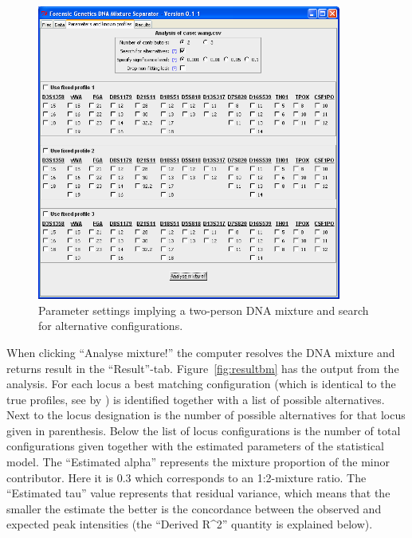 \documentclass[a4paper,11pt]{article}
\begin{document}
\begin{figure}[!h]
  \centering
  \includegraphics[width=10cm]{param_nofixed}
  \caption{\label{fig:nofixed}Parameter settings implying a two-person
    DNA mixture and search for alternative configurations.}
\end{figure}

When clicking ``Analyse mixture!'' the computer resolves the DNA
mixture and returns result in the
``Result''-tab. Figure~\ref{fig:resultbm} has the output from the
analysis. For each locus a best matching configuration (which is
identical to the true profiles, see by \citet{wang2006}) is identified
together with a list of possible alternatives. Next to the locus
designation is the number of possible alternatives for that locus
given in parenthesis. Below the list of locus configurations is the
number of total configurations given together with the estimated
parameters of the statistical model. The ``Estimated alpha''
represents the mixture proportion of the minor contributor. Here it is
0.3 which corresponds to an 1:2-mixture ratio. The ``Estimated tau''
value represents that residual variance, which means that the smaller
the estimate the better is the concordance between the observed and
expected peak intensities (the ``Derived R\^{}2'' quantity is
explained below).
\end{document}
